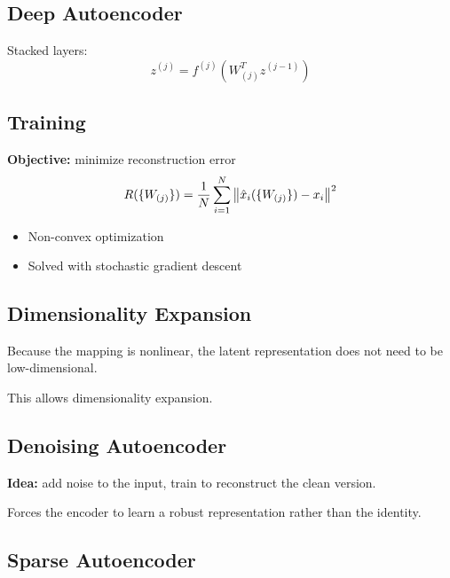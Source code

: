 \documentclass[11pt,a4paper,openany]{book}
\begin{document}
\subsection{Deep Autoencoder}

\begin{defnbox}[title=Deep Autoencoder]
Stacked layers:
\[
z^{(j)} = f^{(j)}\!\left(W_{(j)}^T z^{(j-1)}\right)
\]

\end{defnbox}

\subsection{Training}

\begin{algbox}[title=Autoencoder Training]
\textbf{Objective:} minimize reconstruction error
\[
R(\{W_{(j)}\}) = \frac{1}{N}\sum_{i=1}^{N}\left\lVert \hat{x}_i(\{W_{(j)}\}) - x_i \right\rVert^2
\]
\begin{itemize}
    \item Non-convex optimization
    \item Solved with stochastic gradient descent
\end{itemize}
\end{algbox}

\subsection{Dimensionality Expansion}

\begin{rembox}[title=Dimensionality Expansion]
Because the mapping is nonlinear, the latent representation does not need to be low-dimensional.

This allows dimensionality expansion.
\end{rembox}

\subsection{Denoising Autoencoder}

\begin{rembox}[title=Denoising Autoencoder]
\textbf{Idea:} add noise to the input, train to reconstruct the clean version.

Forces the encoder to learn a robust representation rather than the identity.
\end{rembox}

\subsection{Sparse Autoencoder}
\end{document}
